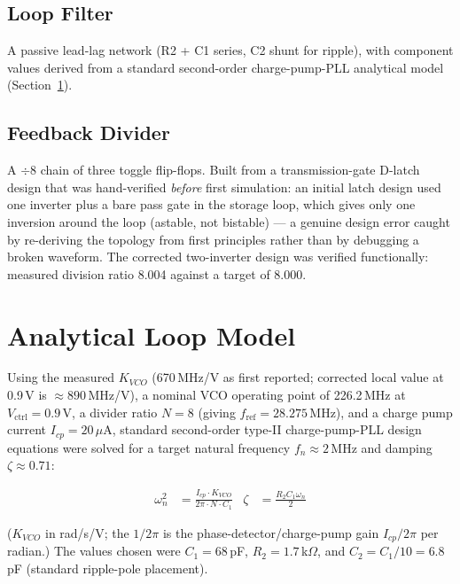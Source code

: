 \documentclass[11pt]{article}
\begin{document}
\subsection{Loop Filter}
A passive lead-lag network (R2 + C1 series, C2 shunt for ripple), with component values derived from a standard second-order charge-pump-PLL analytical model (Section~\ref{sec:loopmodel}).

\subsection{Feedback Divider}
A $\div 8$ chain of three toggle flip-flops. Built from a transmission-gate D-latch design that was hand-verified \emph{before} first simulation: an initial latch design used one inverter plus a bare pass gate in the storage loop, which gives only one inversion around the loop (astable, not bistable) --- a genuine design error caught by re-deriving the topology from first principles rather than by debugging a broken waveform. The corrected two-inverter design was verified functionally: measured division ratio 8.004 against a target of 8.000.

\section{Analytical Loop Model}
\label{sec:loopmodel}

Using the measured $K_{VCO}$ (670\,MHz/V as first reported; corrected local value at 0.9\,V is $\approx 890$\,MHz/V), a nominal VCO operating point of 226.2\,MHz at $V_{\text{ctrl}}=0.9$\,V, a divider ratio $N=8$ (giving $f_{\text{ref}} = 28.275$\,MHz), and a charge pump current $I_{cp} = 20\,\mu$A, standard second-order type-II charge-pump-PLL design equations were solved for a target natural frequency $f_n \approx 2$\,MHz and damping $\zeta \approx 0.71$:

\begin{align*}
\omega_n^2 &= \frac{I_{cp} \cdot K_{VCO}}{2\pi \cdot N \cdot C_1} & \zeta &= \frac{R_2 C_1 \omega_n}{2}
\end{align*}

($K_{VCO}$ in rad/s/V; the $1/2\pi$ is the phase-detector/charge-pump gain $I_{cp}/2\pi$ per radian.) The values chosen were $C_1 = 68$\,pF, $R_2 = 1.7$\,k$\Omega$, and $C_2 = C_1/10 = 6.8$\,pF (standard ripple-pole placement).
\end{document}
